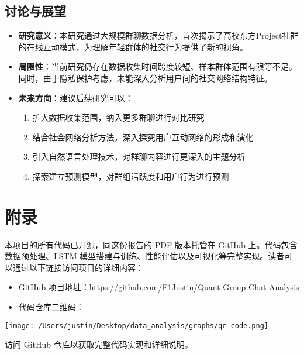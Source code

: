 \documentclass{paper}
\begin{document}
\subsection{讨论与展望}
\begin{itemize}
    \item \textbf{研究意义}：本研究通过大规模群聊数据分析，首次揭示了高校东方Project社群的在线互动模式，为理解年轻群体的社交行为提供了新的视角。

    \item \textbf{局限性}：当前研究仍存在数据收集时间跨度较短、样本群体范围有限等不足。同时，由于隐私保护考虑，未能深入分析用户间的社交网络结构特征。

    \item \textbf{未来方向}：建议后续研究可以：
        \begin{enumerate}
            \item 扩大数据收集范围，纳入更多群聊进行对比研究
            \item 结合社会网络分析方法，深入探究用户互动网络的形成和演化
            \item 引入自然语言处理技术，对群聊内容进行更深入的主题分析
            \item 探索建立预测模型，对群组活跃度和用户行为进行预测
        \end{enumerate}
\end{itemize}

\section*{附录}

本项目的所有代码已开源，同这份报告的 PDF 版本托管在 GitHub 上。代码包含数据预处理、LSTM 模型搭建与训练、性能评估以及可视化等完整实现。读者可以通过以下链接访问项目的详细内容：

\begin{itemize}
    \item GitHub 项目地址：\url{https://github.com/F1Justin/Quant-Group-Chat-Analysis}
    \item 代码仓库二维码：\\
\end{itemize}

\begin{center}
    \texttt{[image: /Users/justin/Desktop/data\_analysis/graphs/qr-code.png]} 
\end{center}

访问 GitHub 仓库以获取完整代码实现和详细说明。
\end{document}
